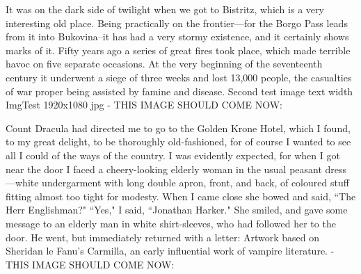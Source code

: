 \renewcommand{\varCaption}{First test image paper width ImgTest 1440x1086 jpg}
\renewcommand{\varImgPath}{_content/ImgTest_1440-1086.jpg}


It was on the dark side of twilight when we got to Bistritz, which is a very interesting old place. Being practically on the frontier---for the Borgo Pass leads from it into Bukovina--it has had a very stormy existence, and it certainly shows marks of it. Fifty years ago a series of great fires took place, which made terrible havoc on five separate occasions. At the very beginning of the seventeenth century it underwent a siege of three weeks and lost 13,000 people, the casualties of war proper being assisted by famine and disease. Second test image text width ImgTest 1920x1080 jpg - THIS IMAGE SHOULD COME NOW:

\renewcommand{\varCaption}{Second test image text width ImgTest 1920x1080 jpg}
\renewcommand{\varImgPath}{_content/ImgTest_1920-1080.jpg}


Count Dracula had directed me to go to the Golden Krone Hotel, which I found, to my great delight, to be thoroughly old-fashioned, for of course I wanted to see all I could of the ways of the country. I was evidently expected, for when I got near the door I faced a cheery-looking elderly woman in the usual peasant dress---white undergarment with long double apron, front, and back, of coloured stuff fitting almost too tight for modesty. When I came close she bowed and said, ``The Herr Englishman?" ``Yes," I said, ``Jonathan Harker." She smiled, and gave some message to an elderly man in white shirt-sleeves, who had followed her to the door. He went, but immediately returned with a letter: Artwork based on Sheridan le Fanu's Carmilla, an early influential work of vampire literature. - THIS IMAGE SHOULD COME NOW:

\renewcommand{\varCaption}{Artwork based on Sheridan le Fanu's Carmilla, an early influential work of vampire literature.}
\renewcommand{\varImgPath}{_content/Sheridan_le_Fanu_Carmilla-1600x1098.jpg}
\renewcommand{\varWrapText}{false} %
\renewcommand{\varFigWidth}{paper} %
\renewcommand{\varFigFloat}{l} %


